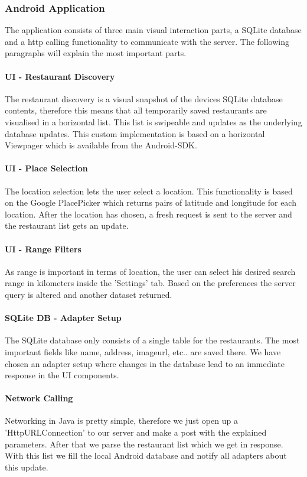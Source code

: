 \subsubsection{Android Application}

The application consists of three main visual interaction parts, a SQLite database and a http calling functionality to communicate with the server. The following paragraphs will explain the most important parts.

\paragraph{UI - Restaurant Discovery}
The restaurant discovery is a visual snapshot of the devices SQLite database contents, therefore this means that all temporarily saved restaurants are visualised in a horizontal list. This list is swipeable and updates as the underlying database updates. This custom implementation is based on a horizontal Viewpager which is available from the Android-SDK.
\paragraph{UI - Place Selection}
The location selection lets the user select a location. This functionality is based on the Google PlacePicker which returns pairs of latitude and longitude for each location. After the location has chosen, a fresh request is sent to the server and the restaurant list gets an update.
\paragraph{UI - Range Filters}
As range is important in terms of location, the user can select his desired search range in kilometers inside the 'Settings' tab. Based on the preferences the server query is altered and another dataset returned.
\paragraph{SQLite DB - Adapter Setup}
The SQLite database only consists of a single table for the restaurants. The most important fields like name, address, imageurl, etc.. are saved there. We have chosen an adapter setup where changes in the database lead to an immediate response in the UI components.
\paragraph{Network Calling}
Networking in Java is pretty simple, therefore we just open up a 'HttpURLConnection' to our server and make a post with the explained parameters. After that we parse the restaurant list which we get in response. With this list we fill the local Android database and notify all adapters about this update.


